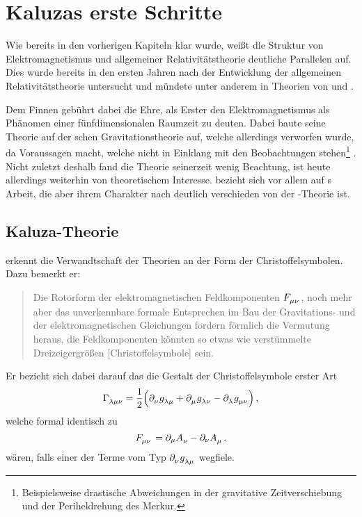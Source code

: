 \chapter{Kaluzas erste Schritte}
Wie bereits in den vorherigen Kapiteln klar wurde, weißt die Struktur von
Elektromagnetismus und allgemeiner Relativitätstheorie deutliche Parallelen auf.
Dies wurde bereits in den ersten Jahren nach der Entwicklung der
allgemeinen Relativitätstheorie untersucht und mündete
unter anderem in Theorien von \cite{weyl1918gravitation} und
 \cite{nordstrom1914moglichkeit}.

Dem Finnen  gebührt dabei die Ehre, als Erster den
Elektromagnetismus als Phänomen einer fünfdimensionalen Raumzeit zu deuten.
Dabei baute seine Theorie auf der schen Gravitationstheorie
auf, welche allerdings verworfen wurde, da Voraussagen macht, welche nicht in
Einklang mit den Beobachtungen stehen\footnote{Beispielsweise drastische
Abweichungen in der gravitative Zeitverschiebung und der Periheldrehung des
Merkur.} .
Nicht zuletzt deshalb fand die Theorie seinerzeit wenig Beachtung, ist heute
allerdings weiterhin von theoretischem Interesse.
 bezieht sich vor allem auf s Arbeit, die aber ihrem
Charakter nach deutlich verschieden von der -Theorie ist.
\section{Kaluza-Theorie}
 erkennt die Verwandtschaft der Theorien an der Form der
Christoffelsymbolen. Dazu bemerkt er\cite{kaluza1921unitatsproblem}:
\begin{quote}
Die Rotorform der elektromagnetischen Feldkomponenten
$\tensor{F}{_\mu_\nu}$, noch mehr aber das
unverkennbare formale Entsprechen im Bau der Gravitations- 
und der elektromagnetischen Gleichungen fordern förmlich
die Vermutung heraus, die Feldkomponenten könnten so etwas wie
verstümmelte Dreizeigergrößen [Christoffelsymbole] sein.
\end{quote}
Er bezieht sich dabei darauf das die Gestalt der Christoffelsymbole erster Art
\begin{equation}
\tensor*{\Gamma}{_\lambda_\mu_\nu}=\frac{1}{2}
\left(\tensor{\partial}{_\nu} \tensor{g}{_\lambda_\mu} +
\tensor{\partial}{_\mu}
\tensor{g}{_\lambda_\nu} - \tensor{\partial}{_\lambda} 
\tensor{g}{_\mu_\nu}\right)\,,
\end{equation}
welche formal identisch zu 
\begin{equation}
\tensor{F}{_\mu_\nu}=\partial_\mu\tensor{A}{_\nu}-\partial_\nu\tensor{A}{_\mu}\,.
\end{equation}
wären, falls einer der Terme vom Typ $\tensor{\partial}{_\nu}
\tensor{g}{_\lambda_\mu}$ wegfiele.

